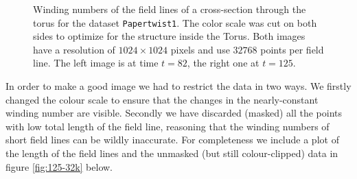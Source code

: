 \documentclass{article}
\begin{document}
\begin{figure}[!htb]
\endminipage
	\caption{Winding numbers of the field lines of a cross-section through the torus for the dataset \texttt{Papertwist1}. The color scale was cut on both sides to optimize for the structure inside the Torus. Both images have a resolution of $1024\times 1024$ pixels and use $32768$ points per field line. The left image is at time $t=82$, the right one at $t=125$.}\label{fig:125-32k}\label{fig:82-32k}
\end{figure}

In order to make a good image we had to restrict the data in two ways. We firstly changed the colour scale to ensure that the changes in the nearly-constant winding number are visible. Secondly we have discarded (masked) all the points with low total length of the field line, reasoning that the winding numbers of short field lines can be wildly inaccurate. For completeness we include a plot of the length of the field lines and the unmasked (but still colour-clipped) data in figure \ref{fig:125-32k} below.\\
\end{document}
